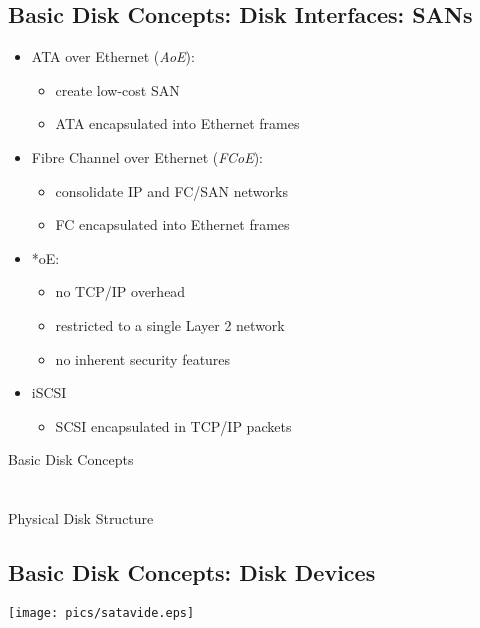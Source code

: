 \documentclass[xga]{xdvislides}
\begin{document}
\subsection{Basic Disk Concepts: Disk Interfaces: SANs}
\begin{itemize}
	\item ATA over Ethernet ({\em AoE}):
		\begin{itemize}
			\item create low-cost SAN
			\item ATA encapsulated into Ethernet frames
		\end{itemize}
	\item Fibre Channel over Ethernet ({\em FCoE}):
		\begin{itemize}
			\item consolidate IP and FC/SAN networks
			\item FC encapsulated into Ethernet frames
		\end{itemize}

	\item *oE:
		\begin{itemize}
			\item no TCP/IP overhead
			\item restricted to a single Layer 2 network
			\item no inherent security features
		\end{itemize}
	\item iSCSI
		\begin{itemize}
			\item SCSI encapsulated in TCP/IP packets
		\end{itemize}
\end{itemize}

\newpage
\vspace*{\fill}
\begin{center}
	\Hugesize
		Basic Disk Concepts\\ [1em]
	\hspace*{5mm}
	\blueline\\
	\hspace*{5mm}\\
		Physical Disk Structure
\end{center}
\vspace*{\fill}

\subsection{Basic Disk Concepts: Disk Devices}
\vfill
	\begin{center}
		\texttt{[image: pics/satavide.eps]} \\
	\end{center}
\vfill
\end{document}
